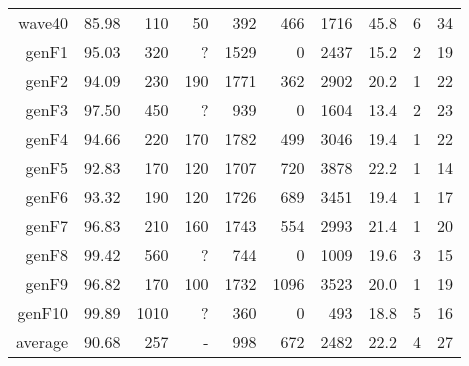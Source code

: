 \begin{table}
\begin{tabular}{|r|r|r|r|r|r|r|r|r|r|}
{\sc wave40} & 85.98 & 110 & 50 & 392 & 466 & 1716 & 45.8 & 6 & 34 \\
{\sc genF1} & 95.03 & 320 & ? & 1529 & 0 & 2437 & 15.2 & 2 & 19 \\
{\sc genF2} & 94.09 & 230 & 190 & 1771 & 362 & 2902 & 20.2 & 1 & 22 \\
{\sc genF3} & 97.50 & 450 & ? & 939 & 0 & 1604 & 13.4 & 2 & 23 \\
{\sc genF4} & 94.66 & 220 & 170 & 1782 & 499 & 3046 & 19.4 & 1 & 22 \\
{\sc genF5} & 92.83 & 170 & 120 & 1707 & 720 & 3878 & 22.2 & 1 & 14 \\
{\sc genF6} & 93.32 & 190 & 120 & 1726 & 689 & 3451 & 19.4 & 1 & 17 \\
{\sc genF7} & 96.83 & 210 & 160 & 1743 & 554 & 2993 & 21.4 & 1 & 20 \\
{\sc genF8} & 99.42 & 560 & ? & 744 & 0 & 1009 & 19.6 & 3 & 15 \\
{\sc genF9} & 96.82 & 170 & 100 & 1732 & 1096 & 3523 & 20.0 & 1 & 19 \\
{\sc genF10} & 99.89 & 1010 & ? & 360 & 0 & 493 & 18.8 & 5 & 16 \\
\hline
average & 90.68 & 257 &  -  & 998 & 672 & 2482 & 22.2 & 4 & 27 \\
\hline
\end{tabular}
\end{table}
\clearpage
